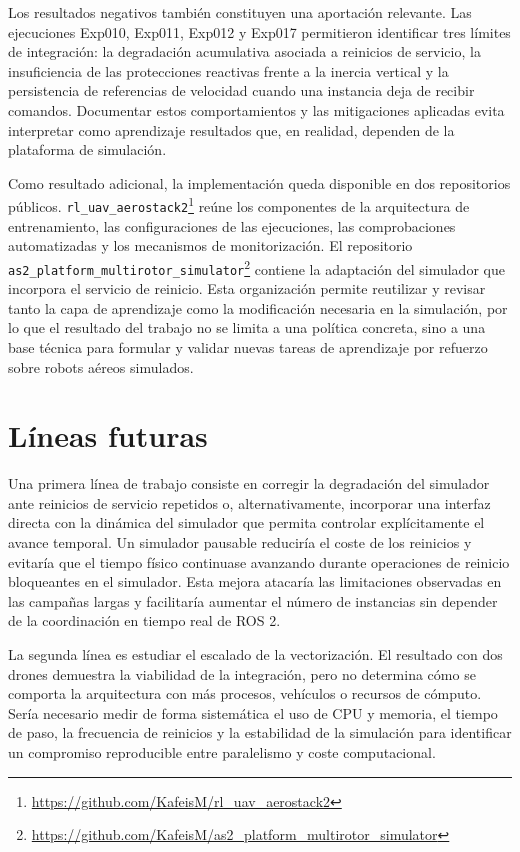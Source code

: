 Los resultados negativos también constituyen una aportación relevante. Las
ejecuciones Exp010, Exp011, Exp012 y Exp017 permitieron identificar tres límites
de integración: la degradación acumulativa asociada a reinicios de servicio, la
insuficiencia de las protecciones reactivas frente a la inercia vertical y la
persistencia de referencias de velocidad cuando una instancia deja de recibir
comandos. Documentar estos comportamientos y las mitigaciones aplicadas evita
interpretar como aprendizaje resultados que, en realidad, dependen de la
plataforma de simulación.

Como resultado adicional, la implementación queda disponible en dos
repositorios públicos. \texttt{rl\_uav\_aerostack2}\footnote{\url{https://github.com/KafeisM/rl_uav_aerostack2}}
reúne los componentes de la arquitectura de entrenamiento, las configuraciones
de las ejecuciones, las comprobaciones automatizadas y los mecanismos de
monitorización. El repositorio
\texttt{as2\_platform\_multirotor\_simulator}\footnote{\url{https://github.com/KafeisM/as2_platform_multirotor_simulator}}
contiene la adaptación del simulador que incorpora el servicio de reinicio. Esta
organización permite reutilizar y revisar tanto la capa de aprendizaje como la
modificación necesaria en la simulación, por lo que el resultado del trabajo no
se limita a una política concreta, sino a una base técnica para formular y
validar nuevas tareas de aprendizaje por refuerzo sobre robots aéreos simulados.

\section{Líneas futuras} \label{sct:conclusiones:futuro}

Una primera línea de trabajo consiste en corregir la degradación del simulador
ante reinicios de servicio repetidos o, alternativamente, incorporar una interfaz
directa con la dinámica del simulador que permita controlar explícitamente el
avance temporal. Un simulador pausable reduciría el coste de los reinicios y
evitaría que el tiempo físico continuase avanzando durante operaciones de reinicio
bloqueantes en el simulador. Esta mejora atacaría las limitaciones observadas en las campañas
largas y facilitaría aumentar el número de instancias sin depender de la
coordinación en tiempo real de ROS 2.

La segunda línea es estudiar el escalado de la vectorización. El resultado con
dos drones demuestra la viabilidad de la integración, pero no determina cómo se
comporta la arquitectura con más procesos, vehículos o recursos de cómputo. Sería
necesario medir de forma sistemática el uso de CPU y memoria, el tiempo de paso,
la frecuencia de reinicios y la estabilidad de la simulación para identificar un
compromiso reproducible entre paralelismo y coste computacional.

